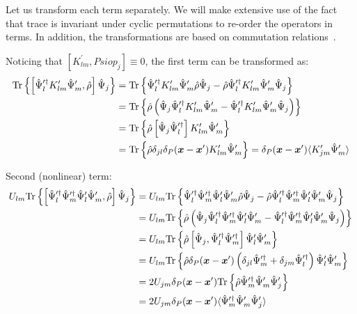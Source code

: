 Let us transform each term separately.
We will make extensive use of the fact that trace is invariant under cyclic permutations to re-order the operators in terms.
In addition, the transformations are based on commutation relations~.

Noticing that $[ K_{lm}^\prime, Psiop_j ] \equiv 0$, the first term can be transformed as:
\begin{equation*}
\begin{split}
	\mathrm{Tr} \left\{ 
		\left[
			\hat{\Psi}_l^{\prime\dagger} K_{lm}^\prime \hat{\Psi}_m^\prime,
			\hat{\rho}
		\right] \hat{\Psi}_j
	 \right\}
	& = \mathrm{Tr} \left\{ 
		\hat{\Psi}_l^{\prime\dagger} K_{lm}^\prime \hat{\Psi}_m^\prime \hat{\rho} \hat{\Psi}_j
		- \hat{\rho} \hat{\Psi}_l^{\prime\dagger} K_{lm}^\prime \hat{\Psi}_m^\prime \hat{\Psi}_j
	 \right\} \\
	& = \mathrm{Tr} \left\{ 
		\hat{\rho} \left(
			\hat{\Psi}_j \hat{\Psi}_l^{\prime\dagger} K_{lm}^\prime \hat{\Psi}_m^\prime
			- \hat{\Psi}_l^{\prime\dagger} K_{lm}^\prime \hat{\Psi}_m^\prime \hat{\Psi}_j
		\right)
	 \right\} \\
	& = \mathrm{Tr} \left\{ 
		\hat{\rho} \left[
			\hat{\Psi}_j \hat{\Psi}_l^{\prime\dagger}
		\right] K_{lm}^\prime \hat{\Psi}_m^\prime
	 \right\} \\
	& = \mathrm{Tr} \left\{ 
		\hat{\rho} \delta_{jl} \delta_P(\boldsymbol{x} - \boldsymbol{x}^\prime) K_{lm}^\prime \hat{\Psi}_m^\prime
	 \right\}
	= \delta_P(\boldsymbol{x} - \boldsymbol{x}^\prime) \langle K_{jm}^\prime \hat{\Psi}_m^\prime \rangle
\end{split}
\end{equation*}

Second (nonlinear) term:
\begin{equation*}
\begin{split}
	U_{lm} \mathrm{Tr} \left\{ 
		\left[
			\hat{\Psi}_l^{\prime\dagger} \hat{\Psi}_m^{\prime\dagger}
			\hat{\Psi}_l^\prime \hat{\Psi}_m^\prime,
			\hat{\rho}
		\right] \hat{\Psi}_j
	 \right\}
	& = U_{lm} \mathrm{Tr} \left\{ 
		\hat{\Psi}_l^{\prime\dagger} \hat{\Psi}_m^{\prime\dagger}
		\hat{\Psi}_l^\prime \hat{\Psi}_m^\prime \hat{\rho} \hat{\Psi}_j
		- \hat{\rho} \hat{\Psi}_l^{\prime\dagger} \hat{\Psi}_m^{\prime\dagger}
		\hat{\Psi}_l^\prime \hat{\Psi}_m^\prime \hat{\Psi}_j
	 \right\} \\
	& = U_{lm} \mathrm{Tr} \left\{ 
		\hat{\rho} \left(
			\hat{\Psi}_j \hat{\Psi}_l^{\prime\dagger} \hat{\Psi}_m^{\prime\dagger}
			\hat{\Psi}_l^\prime \hat{\Psi}_m^\prime
			- \hat{\Psi}_l^{\prime\dagger} \hat{\Psi}_m^{\prime\dagger}
			\hat{\Psi}_l^\prime \hat{\Psi}_m^\prime \hat{\Psi}_j
		\right)
	 \right\} \\
	& = U_{lm} \mathrm{Tr} \left\{ 
		\hat{\rho} \left[
			\hat{\Psi}_j, \hat{\Psi}_l^{\prime\dagger} \hat{\Psi}_m^{\prime\dagger}
		\right] \hat{\Psi}_l^\prime \hat{\Psi}_m^\prime
	 \right\} \\
	& = U_{lm} \mathrm{Tr} \left\{ 
		\hat{\rho} \delta_P(\boldsymbol{x} - \boldsymbol{x}^\prime) \left(
			\delta_{jl} \hat{\Psi}_m^{\prime\dagger}
			+ \delta_{jm} \hat{\Psi}_l^{\prime\dagger}
		\right) \hat{\Psi}_l^\prime \hat{\Psi}_m^\prime
	 \right\} \\
	& = 2 U_{jm} \delta_P(\boldsymbol{x} - \boldsymbol{x}^\prime) \mathrm{Tr} \left\{ 
		\hat{\rho} \hat{\Psi}_m^{\prime\dagger} \hat{\Psi}_m^\prime \hat{\Psi}_j^\prime
	 \right\} \\
	& = 2 U_{jm} \delta_P(\boldsymbol{x} - \boldsymbol{x}^\prime) \langle
		\hat{\Psi}_m^{\prime\dagger} \hat{\Psi}_m^\prime \hat{\Psi}_j^\prime
	\rangle
\end{split}
\end{equation*}

